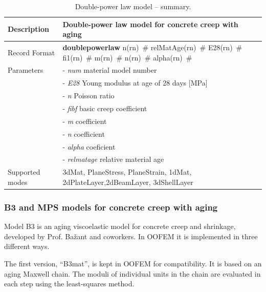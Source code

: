 \documentclass[a4paper]{article}
\newcommand{\descitem}[1]{{\noindent \bf #1}}
\newcommand{\elemparam}[2]{{{#1\tiny (#2)}~\#}}
\newcommand{\param}[1]{{\it #1}}
\begin{document}
\begin{table}[!htb]
\begin{tabular}{|l|p{9cm}|}
\hline
Description & Double-power law model  for concrete creep with aging\\
\hline
Record Format & \descitem{doublepowerlaw}  \elemparam{n}{rn}
\elemparam{relMatAge}{rn} \elemparam{E28}{rn} \elemparam{fi1}{rn} \elemparam{m}{rn}
\elemparam{n}{rn} \elemparam{alpha}{rn} \\
Parameters &- \param{num} material model number\\
&- \param{E28} Young modulus at age of 28 days [MPa]\\
&- \param{n} Poisson ratio\\
&- \param{fibf} basic creep coefficient\\
&- \param{m} coefficient \\
&- \param{n} coefficient \\
&- \param{alpha} coeficient \\
&- \param{relmatage} relative material age \\
Supported modes& 3dMat, PlaneStress, PlaneStrain, 1dMat,
2dPlateLayer,2dBeamLayer, 3dShellLayer\\
\hline
\end{tabular}
\caption{Double-power law model -- summary.}
\label{doublepowerlaw_table}
\end{table}



\subsubsection{B3 and MPS models for concrete creep with aging}

Model B3 is an aging viscoelastic model for concrete creep and shrinkage, developed by Prof. Ba\v{z}ant and coworkers. In OOFEM it is implemented in three different ways. 

The first version, ``B3mat'', is kept in OOFEM for compatibility. It is based on an aging Maxwell chain. The moduli of individual units in the chain are evaluated in each step using the least-squares method.
\end{document}
